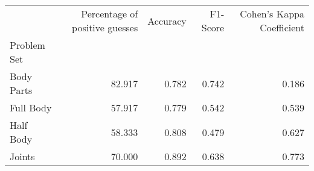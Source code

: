\begin{table}
      \caption[]{}
      \label{}
      \begin{tabular}{lrrrr}
\hline
{} &  Percentage of positive guesses &  Accuracy &  F1-Score &  Cohen's Kappa Coefficient \\
Problem Set   &                                 &           &           &                            \\
\hline
Body Parts &                          82.917 &     0.782 &     0.742 &                      0.186 \\
Full Body  &                          57.917 &     0.779 &     0.542 &                      0.539 \\
Half Body  &                          58.333 &     0.808 &     0.479 &                      0.627 \\
Joints     &                          70.000 &     0.892 &     0.638 &                      0.773 \\
\hline
\end{tabular}
\end{table}